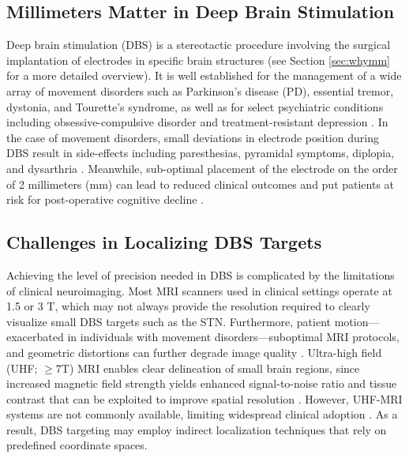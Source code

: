 \subsection{Millimeters Matter in Deep Brain Stimulation}
Deep brain stimulation (DBS) is a stereotactic procedure involving the surgical implantation of electrodes in specific brain structures (see Section \ref{sec:whymm} for a more detailed overview). It is well established for the management of a wide array of movement disorders such as Parkinson's disease (PD), essential tremor, dystonia, and Tourette’s syndrome, as well as for select psychiatric conditions including obsessive-compulsive disorder and treatment-resistant depression \cite{Lozano2019-dv}. In the case of movement disorders, small deviations in electrode position during DBS result in side-effects including paresthesias, pyramidal symptoms, diplopia, and dysarthria \cite{Buhmann2017-da}. Meanwhile, sub-optimal placement of the electrode on the order of 2 millimeters (mm) can lead to reduced clinical outcomes \cite{Horn2019-by} and put patients at risk for post-operative cognitive decline \cite{Reich2022-jf}.

\subsection{Challenges in Localizing DBS Targets}
Achieving the level of precision needed in DBS is complicated by the limitations of clinical neuroimaging. Most MRI scanners used in clinical settings operate at 1.5 or 3 T, which may not always provide the resolution required to clearly visualize small DBS targets such as the STN. Furthermore, patient motion—exacerbated in individuals with movement disorders—suboptimal MRI protocols, and geometric distortions can further degrade image quality \cite{Boutet2021-vg, Chandran2016-eg, Lau2018-fp}. Ultra-high field (UHF; $\geq$7T) MRI enables clear delineation of small brain regions, since increased magnetic field strength yields enhanced signal-to-noise ratio and tissue contrast that can be exploited to improve spatial resolution \cite{Abosch2010-jn, Duchin2012-db, Lau2017-ea, Lau2020-dh, Lenglet2012-ii}. However, UHF-MRI systems are not commonly available, limiting widespread clinical adoption \cite{Clarke2020-ky}. As a result, DBS targeting may employ indirect localization techniques that rely on predefined coordinate spaces.

